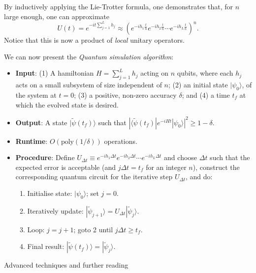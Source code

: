 \documentclass[12pt,oneside]{amsart}
\makeatletter
\def\subsection{\@startsection{subsection}{2}%
  \z@{.5\linespacing\@plus.7\linespacing}{-.5em}%
  {\color{cgblue}\normalfont\sf\bfseries}}
\theoremstyle{plain}%
\theoremstyle{definition}
\theoremstyle{remark}
\makeatother
\begin{document}
By inductively applying the Lie-Trotter formula, one demonstrates that, for $n$ large enough, one can approximate
\begin{equation}
  U(t) = e^{-it\sum_{j=1}^Lh_j} \approx \left(e^{-i h_1\frac{t}{n}}e^{-i h_2\frac{t}{n}}\cdots e^{-i h_L\frac{t}{n}}\right)^{n}.
\end{equation}
Notice that this is now a product of \emph{local} unitary operators.

We can now present the \emph{Quantum simulation algorithm}:
\begin{itemize}
  \item {\bf Input}: (1) A hamiltonian $H = \sum_{j=1}^L h_j$ acting on $n$ qubits, where each $h_j$ acts on a small subsystem of size independent of $n$; (2) an initial state $|\psi_0\rangle$, of the system at $t = 0$; (3) a positive, non-zero accuracy $\delta$; and (4) a time $t_f$ at which the evolved state is desired.
  \item {\bf Output}: A state $|\widetilde{\psi}(t_f)\rangle$ such that $|\langle\widetilde{\psi}(t_f)|e^{-iHt}|\psi_0\rangle|^2 \ge 1-\delta$.
  \item {\bf Runtime}: $O(\text{poly}(1/\delta))$ operations.
  \item {\bf Procedure}: Define $U_{\Delta t} \equiv e^{-i h_1\Delta t}e^{-i h_2\Delta t}\cdots e^{-i h_L\Delta t}$ and choose $\Delta t$ such that the expected error is acceptable (and $j\Delta t = t_f$ for an integer $n$), construct the corresponding quantum circuit for the iterative step $U_{\Delta t}$, and do:
  \begin{enumerate}
    \item Initialise state: $|\psi_0\rangle$; set $j=0$.
    \item Iteratively update: $|\widetilde{\psi}_{j+1}\rangle = U_{\Delta t}|\widetilde{\psi}_{j}\rangle$.
    \item Loop: $j=j+1$; goto 2 until $j\Delta t \ge t_f$.
    \item Final result: $|\widetilde{\psi}(t_f)\rangle=|\widetilde{\psi}_{j}\rangle$.
  \end{enumerate}
\end{itemize}


\subsection{Advanced techniques and further reading}
\end{document}
